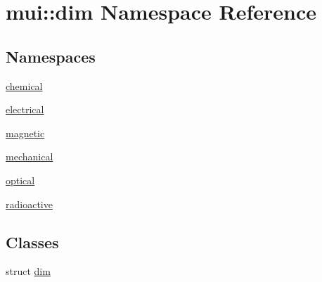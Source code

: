 \hypertarget{namespacemui_1_1dim}{}\section{mui\+:\+:dim Namespace Reference}
\label{namespacemui_1_1dim}
\subsection*{Namespaces}
\begin{DoxyCompactItemize}
\item 
 \hyperlink{namespacemui_1_1dim_1_1chemical}{chemical}
\item 
 \hyperlink{namespacemui_1_1dim_1_1electrical}{electrical}
\item 
 \hyperlink{namespacemui_1_1dim_1_1magnetic}{magnetic}
\item 
 \hyperlink{namespacemui_1_1dim_1_1mechanical}{mechanical}
\item 
 \hyperlink{namespacemui_1_1dim_1_1optical}{optical}
\item 
 \hyperlink{namespacemui_1_1dim_1_1radioactive}{radioactive}
\end{DoxyCompactItemize}
\subsection*{Classes}
\begin{DoxyCompactItemize}
\item 
struct \hyperlink{structmui_1_1dim_1_1dim}{dim}
\end{DoxyCompactItemize}

